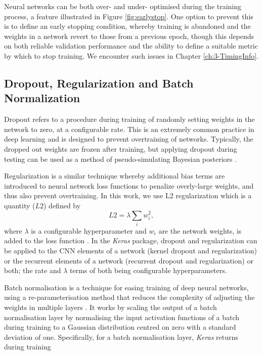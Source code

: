 Neural networks can be both over- and under- optimised during the training process, a feature illustrated in Figure \ref{fig:earlystop}. One option to prevent this is to define an early stopping condition, whereby training is abandoned and the weights in a network revert to those from a previous epoch, though this depends on both reliable validation performance and the ability to define a suitable metric by which to stop training. We encounter such issues in Chapter \ref{ch:3-TimingInfo}.

\subsection{Dropout, Regularization and Batch Normalization}
\label{sec:dropout}
Dropout refers to a procedure during training of randomly setting weights in the network to zero, at a configurable rate. This is an extremely common practice in deep learning and is designed to prevent overtraining of networks. Typically, the dropped out weights are frozen after training, but applying dropout during testing can be used as a method of pseudo-simulating Bayesian posteriors \cite{mike,gal2015}. 

Regularization is a similar technique whereby additional bias terms are introduced to neural network loss functions to penalize overly-large weights, and thus also prevent overtraining. In this work, we use L2 regularization which is a quantity ($L2$) defined by
\begin{equation}
    L2=\lambda\sum_{i}w_i^2,
\end{equation}
where $\lambda$ is a configurable hyperparameter and $w_i$ are the network weights, is added to the loss function \cite{Keras}. In the \textit{Keras} \cite{Keras} package, dropout and regularization can be applied to the CNN elements of a network (kernel dropout and regularization) or the recurrent elements of a network (recurrent dropout and regularization) or both; the rate and $\lambda$ terms of both being configurable hyperparameters.

Batch normalisation is a technique for easing training of deep neural networks, using a re-parameterisation method that reduces the complexity of adjusting the weights in multiple layers \cite{goodfellow2016deep}. It works by scaling the output of a batch normalisation layer by normalising the input activation functions of a batch during training to a Gaussian distribution centred on zero with a standard deviation of one. Specifically, for a batch normalisation layer, \textit{Keras} returns during training

